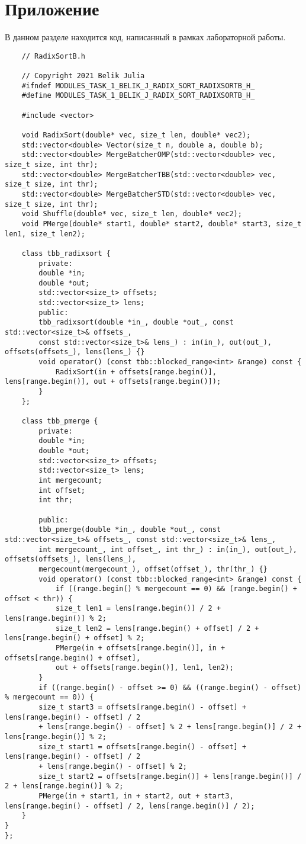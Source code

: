 \documentclass{report}
\begin{document}
\section*{Приложение}
В данном разделе находится код, написанный в рамках лабораторной работы.
\begin{lstlisting}
	// RadixSortB.h
	
	// Copyright 2021 Belik Julia
	#ifndef MODULES_TASK_1_BELIK_J_RADIX_SORT_RADIXSORTB_H_
	#define MODULES_TASK_1_BELIK_J_RADIX_SORT_RADIXSORTB_H_
	
	#include <vector>
	
	void RadixSort(double* vec, size_t len, double* vec2);
	std::vector<double> Vector(size_t n, double a, double b);
	std::vector<double> MergeBatcherOMP(std::vector<double> vec, size_t size, int thr);
	std::vector<double> MergeBatcherTBB(std::vector<double> vec, size_t size, int thr);
	std::vector<double> MergeBatcherSTD(std::vector<double> vec, size_t size, int thr);
	void Shuffle(double* vec, size_t len, double* vec2);
	void PMerge(double* start1, double* start2, double* start3, size_t len1, size_t len2);
	
	class tbb_radixsort {
		private:
		double *in;
		double *out;
		std::vector<size_t> offsets;
		std::vector<size_t> lens;
		public:
		tbb_radixsort(double *in_, double *out_, const std::vector<size_t>& offsets_,
		const std::vector<size_t>& lens_) : in(in_), out(out_), offsets(offsets_), lens(lens_) {}
		void operator() (const tbb::blocked_range<int> &range) const {
			RadixSort(in + offsets[range.begin()], lens[range.begin()], out + offsets[range.begin()]);
		}
	};
	
	class tbb_pmerge {
		private:
		double *in;
		double *out;
		std::vector<size_t> offsets;
		std::vector<size_t> lens;
		int mergecount;
		int offset;
		int thr;
		
		public:
		tbb_pmerge(double *in_, double *out_, const std::vector<size_t>& offsets_, const std::vector<size_t>& lens_,
		int mergecount_, int offset_, int thr_) : in(in_), out(out_), offsets(offsets_), lens(lens_),
		mergecount(mergecount_), offset(offset_), thr(thr_) {}
		void operator() (const tbb::blocked_range<int> &range) const {
			if ((range.begin() % mergecount == 0) && (range.begin() + offset < thr)) {
			size_t len1 = lens[range.begin()] / 2 + lens[range.begin()] % 2;
			size_t len2 = lens[range.begin() + offset] / 2 + lens[range.begin() + offset] % 2;
			PMerge(in + offsets[range.begin()], in + offsets[range.begin() + offset],
			out + offsets[range.begin()], len1, len2);
		}
		if ((range.begin() - offset >= 0) && ((range.begin() - offset) % mergecount == 0)) {
		size_t start3 = offsets[range.begin() - offset] + lens[range.begin() - offset] / 2
		+ lens[range.begin() - offset] % 2 + lens[range.begin()] / 2 + lens[range.begin()] % 2;
		size_t start1 = offsets[range.begin() - offset] + lens[range.begin() - offset] / 2
		+ lens[range.begin() - offset] % 2;
		size_t start2 = offsets[range.begin()] + lens[range.begin()] / 2 + lens[range.begin()] % 2;
		PMerge(in + start1, in + start2, out + start3, lens[range.begin() - offset] / 2, lens[range.begin()] / 2);
	}
}
};


\end{lstlisting}
\end{document}
